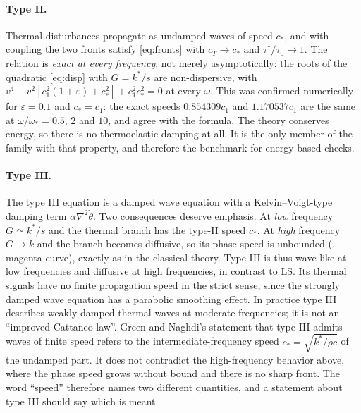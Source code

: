 \paragraph{Type II.} Thermal disturbances propagate as undamped waves of speed $c_*$, and with coupling the two fronts satisfy \eqref{eq:fronts} with $c_T\to c_*$ and $\tau^\dagger/\tau_0\to1$. The relation is \emph{exact at every frequency}, not merely asymptotically: the roots of the quadratic \eqref{eq:disp} with $G=k^*/s$ are non-dispersive, with $v^4-v^2[c_1^2(1+\varepsilon)+c_*^2]+c_1^2c_*^2=0$ at every $\omega$. This was confirmed numerically for $\varepsilon=0.1$ and $c_*=c_1$: the exact speeds $0.854309c_1$ and $1.170537c_1$ are the same at $\omega/\omega_*=0.5$, $2$ and $10$, and agree with the formula. The theory conserves energy, so there is no thermoelastic damping at all. It is the only member of the family with that property, and therefore the benchmark for energy-based checks.
\paragraph{Type III.} The type III equation is a damped wave equation with a Kelvin--Voigt-type damping term $\alpha\nabla^2\dot\theta$. Two consequences deserve emphasis. At \emph{low} frequency $G\simeq k^*/s$ and the thermal branch has the type-II speed $c_*$. At \emph{high} frequency $G\to k$ and the branch becomes diffusive, so its phase speed is unbounded (, magenta curve), exactly as in the classical theory. Type III is thus wave-like at low frequencies and diffusive at high frequencies, in contrast to LS. Its thermal signals have no finite propagation speed in the strict sense, since the strongly damped wave equation has a parabolic smoothing effect. In practice type III describes weakly damped thermal waves at moderate frequencies; it is not an ``improved Cattaneo law''. Green and Naghdi's statement that type III admits waves of finite speed refers to the intermediate-frequency speed $c_*=\sqrt{k^*/\rho c}$ of the undamped part. It does not contradict the high-frequency behavior above, where the phase speed grows without bound and there is no sharp front. The word ``speed'' therefore names two different quantities, and a statement about type III should say which is meant.
